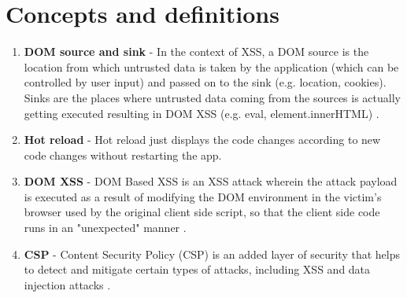 \chapter*{Concepts and definitions} %
\label{definitions}

\begin{enumerate}
  \item \label{def:dom_source_sink} \textbf{DOM source and sink} - In the context of XSS, a DOM
        source is the location from which untrusted data is taken by the application (which can be
        controlled by user input) and passed on to the sink (e.g. location, cookies). Sinks are the
        places where untrusted data coming from the sources is actually getting executed resulting
        in DOM XSS (e.g. eval, element.innerHTML) \cite{source_sink_definition}.
  \item \label{def:hot_reload} \textbf{Hot reload} - Hot reload just displays the code changes
        according to new code changes without restarting the app.
  \item \label{def:dom_xss} \textbf{DOM XSS} - DOM Based XSS is an XSS attack wherein the attack
        payload is executed as a result of modifying the DOM environment in the victim's browser
        used by the original client side script, so that the client side code runs in an
        "unexpected" manner \cite{owasp_dom_xss_def}.
  \item \label{def:csp} \textbf{CSP} - Content Security Policy (CSP) is an added layer of security
        that helps to detect and mitigate certain types of attacks, including XSS and data injection
        attacks \cite{mdn_csp_def}.
\end{enumerate}
